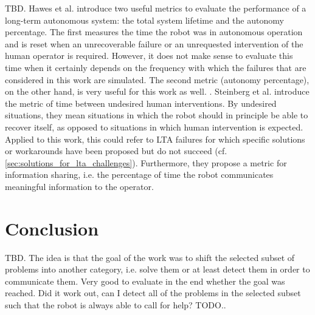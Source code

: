 \documentclass[english, master, utf8]{base/thesis_KBS}
\begin{document}
TBD.
Hawes et al. introduce two useful metrics to evaluate the performance of a long-term autonomous system: the total system lifetime and the autonomy percentage. \cite{Hawes:2017} The
first measures the time the robot was in autonomous operation and is reset when an unrecoverable failure or an unrequested intervention of the human operator is required. However,
it does not make sense to evaluate this time when it certainly depends on the frequency with which the failures that are considered in this work are simulated. The second metric
(autonomy percentage), on the other hand, is very useful for this work as well. . \cite{Hawes:2017}
Steinberg et al. \cite{Steinberg:2016} introduce the metric of time between undesired human interventions. By undesired situations, they mean situations in which the robot should
in principle be able to recover itself, as opposed to situations in which human intervention is expected. Applied to this work, this could refer to LTA failures for which specific
solutions or workarounds have been proposed but do not succeed (cf. \ref{sec:solutions_for_lta_challenges}). Furthermore, they propose a metric for information sharing, i.e. the
percentage of time the robot communicates meaningful information to the operator.

\chapter{Conclusion}

TBD.\newline
The idea is that the goal of the work was to shift the selected subset of problems into another category, i.e. solve them or at least detect them in order to communicate them.
Very good to evaluate in the end whether the goal was reached. Did it work out, can I detect all of the problems in the selected subset such that the robot is always able to call
for help? TODO..


\end{document}
